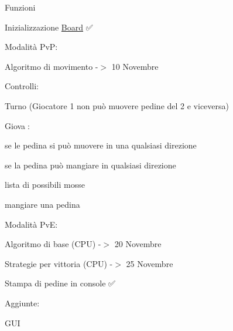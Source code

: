 Funzioni


\begin{DoxyItemize}
\item Inizializzazione \mbox{\hyperlink{struct_board}{Board}} ✅
\item Modalità PvP\+:
\begin{DoxyItemize}
\item Algoritmo di movimento -\/$>$ 10 Novembre
\begin{DoxyItemize}
\item Controlli\+:
\begin{DoxyItemize}
\item Turno (Giocatore 1 non può muovere pedine del 2 e viceversa)
\item Giova🖕\+:
\begin{DoxyItemize}
\item se le pedina si può muovere in una qualsiasi direzione
\item se la pedina può mangiare in qualsiasi direzione
\item lista di possibili mosse
\item mangiare una pedina
\end{DoxyItemize}
\end{DoxyItemize}
\end{DoxyItemize}
\end{DoxyItemize}
\end{DoxyItemize}

Modalità PvE\+:
\begin{DoxyItemize}
\item Algoritmo di base (CPU) -\/$>$ 20 Novembre
\item Strategie per vittoria (CPU) -\/$>$ 25 Novembre
\end{DoxyItemize}

Stampa di pedine in console ✅

Aggiunte\+:
\begin{DoxyItemize}
\item GUI 
\end{DoxyItemize}